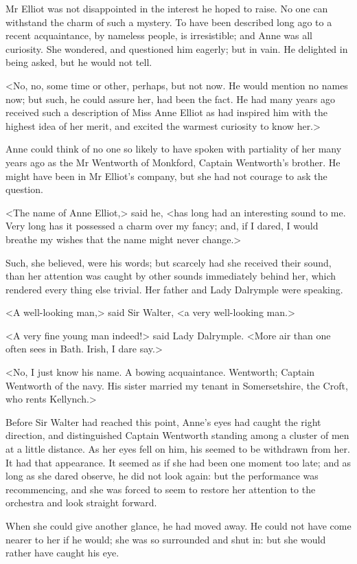 Mr Elliot was not disappointed in the interest he hoped to raise. No one can withstand the charm of such a mystery. To have been described long ago to a recent acquaintance, by nameless people, is irresistible; and Anne was all curiosity. She wondered, and questioned him eagerly; but in vain. He delighted in being asked, but he would not tell.

<No, no, some time or other, perhaps, but not now. He would mention no names now; but such, he could assure her, had been the fact. He had many years ago received such a description of Miss Anne Elliot as had inspired him with the highest idea of her merit, and excited the warmest curiosity to know her.>

Anne could think of no one so likely to have spoken with partiality of her many years ago as the Mr Wentworth of Monkford, Captain Wentworth's brother. He might have been in Mr Elliot's company, but she had not courage to ask the question.

<The name of Anne Elliot,> said he, <has long had an interesting sound to me. Very long has it possessed a charm over my fancy; and, if I dared, I would breathe my wishes that the name might never change.>

Such, she believed, were his words; but scarcely had she received their sound, than her attention was caught by other sounds immediately behind her, which rendered every thing else trivial. Her father and Lady Dalrymple were speaking.

<A well-looking man,> said Sir Walter, <a very well-looking man.>

<A very fine young man indeed!> said Lady Dalrymple. <More air than one often sees in Bath. Irish, I dare say.>

<No, I just know his name. A bowing acquaintance. Wentworth; Captain Wentworth of the navy. His sister married my tenant in Somersetshire, the Croft, who rents Kellynch.>

Before Sir Walter had reached this point, Anne's eyes had caught the right direction, and distinguished Captain Wentworth standing among a cluster of men at a little distance. As her eyes fell on him, his seemed to be withdrawn from her. It had that appearance. It seemed as if she had been one moment too late; and as long as she dared observe, he did not look again: but the performance was recommencing, and she was forced to seem to restore her attention to the orchestra and look straight forward.

When she could give another glance, he had moved away. He could not have come nearer to her if he would; she was so surrounded and shut in: but she would rather have caught his eye.

